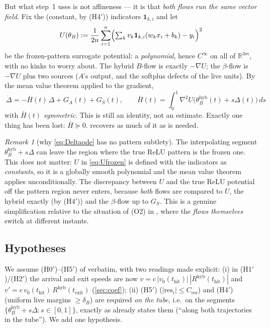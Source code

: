 \documentclass[11pt]{article}
\theoremstyle{remark}
\newtheorem{remark}[theorem]{Remark}
\newcommand{\R}{\mathbb{R}}
\newcommand{\thit}{t_{\mathrm{hit}}}
\newcommand{\texit}{t_{\mathrm{exit}}}
\newcommand{\hyb}{\mathrm{hyb}}
\newcommand{\res}{\mathrm{res}}
\newcommand{\Cres}{C_{\mathrm{res}}}
\newcommand{\hyplabel}[1]{\textup{(#1)}}
\begin{document}
But what step~1 uses is not affineness --- it is that \emph{both flows run the
same vector field}. Fix the (constant, by \hyplabel{H4$'$}) indicators
$\mathbf1_{k,i}$ and let
\begin{equation}\label{eq:Ufrozen}
U(\theta_B):=\frac{1}{2n}\sum_{i=1}^n
\Bigl(\textstyle\sum_{k}v_k\mathbf1_{k,i}(w_kx_i+b_k)-y_i\Bigr)^2
\end{equation}
be the frozen-pattern surrogate potential: a \emph{polynomial}, hence $C^\infty$
on all of $\R^{3m}$, with no kinks to worry about. The hybrid $B$-flow is
exactly $-\nabla U$; the $\beta$-flow is $-\nabla U$ plus two sources ($A$'s
output, and the softplus defects of the live units). By the mean value theorem
applied to the gradient,
\begin{equation}\label{eq:Deltaode}
\boxed{\ \dot\Delta=-\bar H(t)\,\Delta+G_A(t)+G_S(t),\qquad
\bar H(t)=\int_0^1\nabla^2U\bigl(\theta_B^{\hyb}(t)+s\Delta(t)\bigr)\,ds\ }
\end{equation}
with $\bar H(t)$ \emph{symmetric}. This is still an identity, not an estimate.
Exactly one thing has been lost: $\bar H\succeq0$.  recovers as
much of it as is needed.

\begin{remark}[why \eqref{eq:Deltaode} has no pattern subtlety]\label{rem:noswitch}
The interpolating segment $\theta_B^{\hyb}+s\Delta$ can leave the region where
the true ReLU pattern is the frozen one. This does not matter: $U$ in
\eqref{eq:Ufrozen} is defined with the indicators as \emph{constants}, so it is
a globally smooth polynomial and the mean value theorem applies unconditionally.
The discrepancy between $U$ and the true ReLU potential off the pattern region
never enters, because \emph{both} flows are compared to $U$, the hybrid exactly
(by \hyplabel{H4$'$}) and the $\beta$-flow up to $G_S$. This is a genuine
simplification relative to the situation of (O2) in \cite{paper}, where the
\emph{flows themselves} switch at different instants.
\end{remark}

\subsection{Hypotheses}

We assume \hyplabel{H0$'$}--\hyplabel{H5$'$} of \cite[\S3.1]{paper} verbatim,
with two readings made explicit: (i) in \hyplabel{H1$'$}/\hyplabel{H2$'$} the
arrival and exit speeds are now $v=c\,|v_0(\thit)|\,|R^{\hyb}(\thit)|$ and
$v'=c\,v_0(\thit)\,R^{\hyb}(\texit)$ (\cref{sec:coef}); (ii) \hyplabel{H5$'$}
($|\res_i|\le\Cres$) and \hyplabel{H4$'$} (uniform live margins $\ge\delta_B$)
are required \emph{on the tube}, i.e.\ on the segments
$\{\theta_B^{\hyb}+s\Delta:s\in[0,1]\}$, exactly as \cite{paper} already states
them (``along both trajectories in the tube''). We add one hypothesis.
\end{document}
